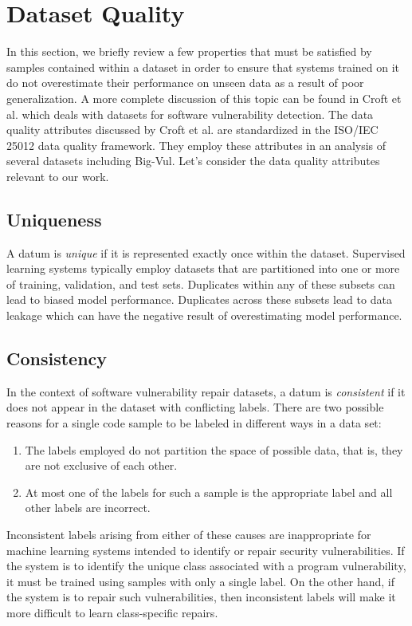\section{Dataset Quality}

In this section, we briefly review a few properties that must be satisfied by samples contained within a dataset in order to ensure that systems trained on it do not overestimate their performance on unseen data as a result of poor generalization.
A more complete discussion of this topic can be found in Croft et al.\cite{croft2023data} which deals with datasets for software vulnerability detection.
The data quality attributes discussed by Croft et al. are standardized in the ISO/IEC 25012 data quality framework\cite{iso/iec25012}.
They employ these attributes in an analysis of several datasets including Big-Vul.
Let's consider the data quality attributes relevant to our work.

\subsection{Uniqueness}
A datum is \emph{unique} if it is represented exactly once within the dataset.
Supervised learning systems typically employ datasets that are partitioned into one or more of training, validation, and test sets.
Duplicates within any of these subsets can lead to biased model performance.
Duplicates across these subsets lead to data leakage which can have the negative result of overestimating model performance.

\subsection{Consistency}
In the context of software vulnerability repair datasets, a datum is \emph{consistent} if it does not appear in the dataset with conflicting labels.
There are two possible reasons for a single code sample to be labeled in different ways in a data set:

\begin{enumerate}
    \item The labels employed do not partition the space of possible data, that is, they are not exclusive of each other.

    \item At most one of the labels for such a sample is the appropriate label and all other labels are incorrect.
\end{enumerate}

Inconsistent labels arising from either of these causes are inappropriate for machine learning systems intended to identify or repair security vulnerabilities.
If the system is to identify the unique class associated with a program vulnerability, it must be trained using samples with only a single label.
On the other hand, if the system is to repair such vulnerabilities, then inconsistent labels will make it more difficult to learn class-specific repairs. 

